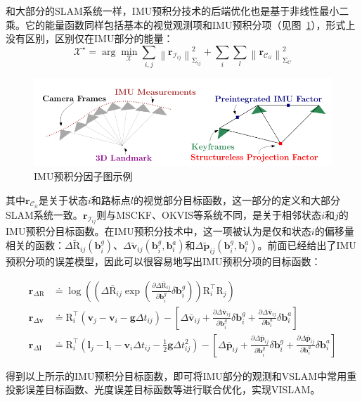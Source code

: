 和大部分的SLAM系统一样，IMU预积分技术的后端优化也是基于非线性最小二乘。它的能量函数同样包括基本的视觉观测项和IMU预积分项（见图~\ref{fig:preint}），形式上没有区别，区别仅在IMU部分的能量：
\begin{equation}\label{eq:gtsam_res}
    \bm{\mathcal X}^\star =
        \arg\mathop{\min}_{\bm{\mathcal X}}
        \sum_{i,j}\left\| \bm{r}_{\mathcal{I}_{ij}} \right\|^2_{\mathrm\Sigma_{ij}} +
        \sum_{i} \sum_{l} \left\| \bm{r}_{\mathcal{C}_{il}} \right\|^2_{\mathrm\Sigma_{C}}
\end{equation}

\begin{figure}[htb!]
    \centering
    \includegraphics[width=.6\textwidth]{Pictures/preint.png}
    \caption{IMU预积分因子图示例\citep{forster2017manifold}}
    \label{fig:preint}
\end{figure}

其中$\bm{r}_{\mathcal{C}_{il}}$是关于状态$i$和路标点$l$的视觉部分目标函数，这一部分的定义和大部分SLAM系统一致。$\bm{r}_{\mathcal{I}_{ij}}$则与MSCKF、OKVIS等系统不同，是关于相邻状态$i$和$j$的IMU预积分目标函数。在IMU预积分技术中，这一项被认为是仅和状态$i$的偏移量相关的函数：$\Delta\tilde{\mathrm R}_{ij}(\bm{b}^g_i)$、$\Delta\tilde{\bm v}_{ij}(\bm{b}^g_i, \bm{b}^a_i)$和$\Delta\tilde{\bm p}_{ij}(\bm{b}^g_i, \bm{b}^a_i)$。前面已经给出了IMU预积分项的误差模型，因此可以很容易地写出IMU预积分项的目标函数：

\begin{equation}
\begin{aligned}
  \bm{r}_{\Delta\mathrm{R}}
    &\doteq
      \log\left(
        \left(
          \Delta\bar{\mathrm R}_{ij}
          \exp\left(
            \tfrac{\partial\Delta\bar{\mathrm R}_{ij}}{\partial\bm{b}^g_i}
            \delta\bm{b}^g_i\right)
        \right) \mathrm{R}^\top_i \mathrm{R}_j
      \right) \\
  \bm{r}_{\Delta\bm{v}}
    &\doteq
      \mathrm{R}^\top_i(\bm{v}_j - \bm{v}_i - \bm{g}\Delta t_{ij}) -
      \left[
        \Delta\bar{\bm v}_{ij} +
        \tfrac{\partial\Delta\bar{\bm v}_{ij}}{\partial\bm{b}^g_i}
        \delta\bm{b}^g_i +
        \tfrac{\partial\Delta\bar{\bm v}_{ij}}{\partial\bm{b}^a_i}
        \delta\bm{b}^a_i
      \right] \\
  \bm{r}_{\Delta\bm{l}}
    &\doteq
      \mathrm{R}^\top_i(
        \bm{l}_j - \bm{l}_i -
        \bm{v}_i \Delta t_{ij} -
        \tfrac{1}{2}\bm{g}\Delta t^2_{ij}) -
      \left[
        \Delta\bar{\bm p}_{ij} +
        \tfrac{\partial\Delta\bar{\bm p}_{ij}}{\partial\bm{b}^g_i}
        \delta\bm{b}^g_i +
        \tfrac{\partial\Delta\bar{\bm p}_{ij}}{\partial\bm{b}^a_i}
        \delta\bm{b}^a_i \right]
\end{aligned}
\end{equation}

得到以上所示的IMU预积分目标函数，即可将IMU部分的观测和VSLAM中常用重投影误差目标函数、光度误差目标函数等进行联合优化，实现VISLAM。

